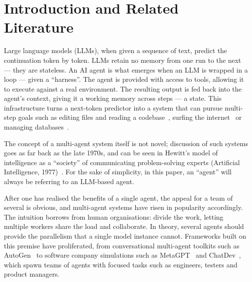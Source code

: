 \documentclass[11pt,a4paper]{article}
\begin{document}
\clearpage
{}
%
%
\section{Introduction and Related Literature}\label{sec:intro}

Large language models (LLMs), when given a sequence of text, predict the continuation token by token. LLMs retain no memory from one run to the next --- they are stateless. An AI agent is what emerges when an LLM is wrapped in a loop --- given a ``harness''. The agent is provided with access to tools, allowing it to execute against a real environment. The resulting output is fed back into the agent's context, giving it a working memory across steps --- a state. This infrastructure turns a next-token predictor into a system that can pursue multi-step goals such as editing files and reading a codebase~\cite{yang2024sweagent}, surfing the internet~\cite{yao2022webshop} or managing databases~\cite{pourreza2023dinsql}.

The concept of a multi-agent system itself is not novel; discussion of such systems goes as far back as the late 1970s, and can be seen in Hewitt's model of intelligence as a ``society'' of communicating problem-solving experts (Artificial Intelligence, 1977)~\cite{hewitt1977control}. For the sake of simplicity, in this paper, an ``agent'' will always be referring to an LLM-based agent.

After one has realised the benefits of a single agent, the appeal for a team of several is obvious, and multi-agent systems have risen in popularity accordingly. The intuition borrows from human organisations: divide the work, letting multiple workers share the load and collaborate. In theory, several agents should provide the parallelism that a single model instance cannot. Frameworks built on this premise have proliferated, from conversational multi-agent toolkits such as AutoGen~\cite{wu2023autogen} to software company simulations such as MetaGPT~\cite{hong2023metagpt} and ChatDev~\cite{qian2024chatdev}, which spawn teams of agents with focused tasks such as engineers, testers and product managers.
\end{document}
